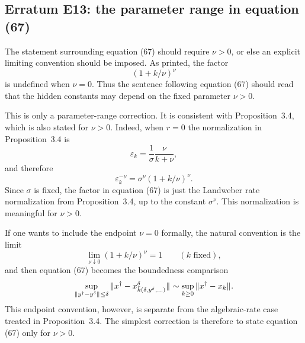 
\subsection*{Erratum E13: the parameter range in equation (67)}
\label{s:erratum:E13}

The statement surrounding equation (67) should require $\nu>0$, or else
an explicit limiting convention should be imposed.  As printed, the factor
\[
        (1+k/\nu)^\nu
\]
is undefined when $\nu=0$.  Thus the sentence following equation (67)
should read that the hidden constants may depend on the fixed parameter
$\nu>0$.

This is only a parameter-range correction.  It is consistent with
Proposition~3.4, which is also stated for $\nu>0$.  Indeed, when
$r=0$ the normalization in Proposition~3.4 is
\[
        \varepsilon_k
        =
        \frac{1}{\sigma}\frac{\nu}{k+\nu},
\]
and therefore
\[
        \varepsilon_k^{-\nu}
        =
        \sigma^\nu(1+k/\nu)^\nu .
\]
Since $\sigma$ is fixed, the factor in equation (67) is just the
Landweber rate normalization from Proposition~3.4, up to the
constant $\sigma^\nu$.  This normalization is meaningful for $\nu>0$.

If one wants to include the endpoint $\nu=0$ formally, the natural
convention is the limit
\[
        \lim_{\nu\downarrow0}(1+k/\nu)^\nu = 1
        \qquad (k \text{ fixed}),
\]
and then equation (67) becomes the boundedness comparison
\[
        \sup_{\|  y^\dag - y^\delta  \|_{  } \le \delta}
        \| x^\dag - x_{\bar{k}(\delta,y^\delta,\ldots)}^\delta \|_{  }
        \sim
        \sup_{k\geq0}
        \| x^\dag - x_k \|_{  } .
\]
This endpoint convention, however, is separate from the algebraic-rate
case treated in Proposition~3.4.  The simplest correction is
therefore to state equation (67) only for $\nu>0$.
